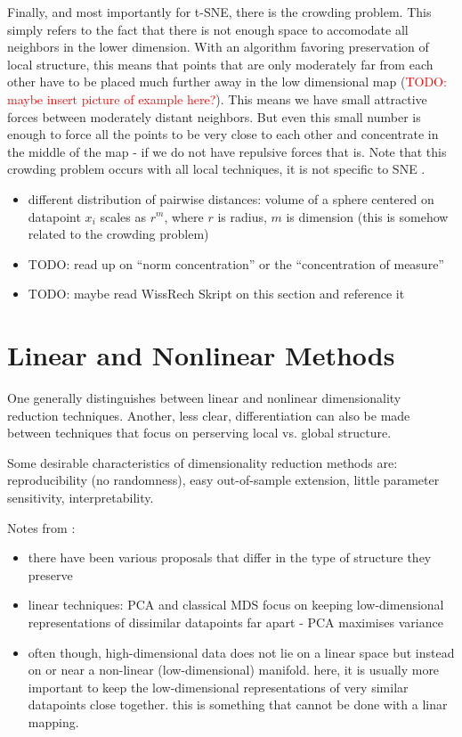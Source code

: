 Finally, and most importantly for t-SNE, there is the crowding problem. 
This simply refers to the fact that there is not enough space to accomodate all neighbors in the lower dimension. 
With an algorithm favoring preservation of local structure, this means that points that are only moderately far from each other have to be placed much further away in the low dimensional map (\textcolor{red}{TODO: maybe insert picture of example here?}). 
This means we have small attractive forces between moderately distant neighbors. 
But even this small number is enough to force all the points to be very close to each other and concentrate in the middle of the map - if we do not have repulsive forces that is. 
Note that this crowding problem occurs with all local techniques, it is not specific to SNE \cite{vdMaa08}. 


\begin{itemize}
    \item different distribution of pairwise distances: volume of a sphere centered on datapoint $x_i$ scales as $r^m$, where $r$ is radius, $m$ is dimension (this is somehow related to the crowding problem) \cite{vdMaa08}
    \item TODO: read up on \enquote{norm concentration} or the \enquote{concentration of measure}
    \item TODO: maybe read WissRech Skript on this section and reference it 
\end{itemize}

\section{Linear and Nonlinear Methods}
One generally distinguishes between linear and nonlinear dimensionality reduction techniques. Another, less clear, differentiation can also be made between techniques that focus on perserving local vs. global structure. 

Some desirable characteristics of dimensionality reduction methods are: reproducibility (no randomness), easy out-of-sample extension, little parameter sensitivity, interpretability.  

Notes from \cite{vdMaa08}: 
\begin{itemize}
    \item there have been various proposals that differ in the type of structure they preserve 
    \item linear techniques: PCA and classical MDS focus on keeping low-dimensional representations of dissimilar datapoints far apart - PCA maximises variance 
    \item often though, high-dimensional data does not lie on a linear space but instead on or near a non-linear (low-dimensional) manifold. here, it is usually more important to keep the low-dimensional representations of very similar datapoints close together. this is something that cannot be done with a linar mapping. 
\end{itemize}

